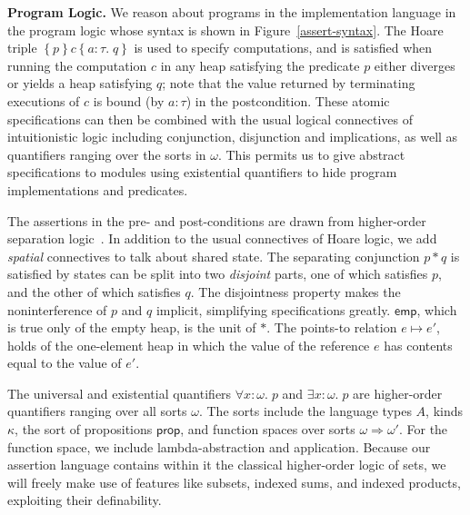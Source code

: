 \documentclass[nocopyrightspace,preprint]{sigplanconf}
\newcommand{\setof}[1]{\left\{{#1}\right\}}
\newcommand{\newref}[1]{\term{new}({#1})}
\newcommand{\term}[1]{\ensuremath{\mathtt{{#1}}}}
\newcommand{\spec}[4]{\setof{{#1}}{#2}\setof{{#3}.\;{#4}}}
\newcommand{\To}{\Rightarrow}
\newcommand{\reftype}[1]{\mathsf{ref}\;{#1}}
\newcommand{\suspend}[1]{[{#1}]}
\newcommand{\letv}[3]{\term{letv}\;{#1} = {#2}\;\term{in}\;{#3}}
\newcommand{\pointsto}{\mapsto}
\newcommand{\emp}{\mathsf{emp}}
\newcommand{\assert}{\mathsf{prop}}
\begin{document}

\noindent \textbf{Program Logic.} We reason about programs in the implementation language in the program
logic whose syntax is shown in Figure~\ref{assert-syntax}. The Hoare triple
$\spec{p}{c}{a:\tau}{q}$ is used to specify computations, and is satisfied when
running the computation $c$ in any heap satisfying the predicate $p$ either diverges or yields a heap satisfying $q$; note that the value returned by terminating executions of $c$ is bound (by $a:\tau$) in the postcondition.
These atomic specifications can then be combined with
the usual logical connectives of intuitionistic logic including
conjunction, disjunction and implications, as well as quantifiers
ranging over the sorts in $\omega$. This permits us to give abstract
specifications to modules using existential quantifiers to hide
program implementations and predicates.

The assertions in the pre- and post-conditions are drawn
from higher-order separation logic~\cite{hosl}. In addition to the
usual connectives of Hoare logic, we add \emph{spatial}
connectives to talk about shared state. The separating conjunction $p *
q$ is satisfied by states can be split into two \emph{disjoint} parts,
one of which satisfies $p$, and the other of which satisfies
$q$. The disjointness property makes the
noninterference of $p$ and $q$ implicit, simplifying specifications
greatly. 
$\emp$, which is true only of the empty heap, is the unit of $*$. The points-to relation $e
\pointsto e'$, holds of the one-element heap in which the value
of the reference $e$ has contents equal to the value of $e'$.

The universal and existential quantifiers $\forall x:\omega.\;p$ and
$\exists x:\omega.\;p$ are higher-order quantifiers ranging over all
sorts $\omega$. The sorts include the language types $A$, kinds
$\kappa$, the sort of propositions $\assert$, and function spaces over
sorts $\omega \To \omega'$.  For the function space, we
include lambda-abstraction and application. Because our assertion
language contains within it the classical higher-order logic of sets,
we will freely make use of features like subsets, indexed sums, and
indexed products, exploiting their definability.
\end{document}

